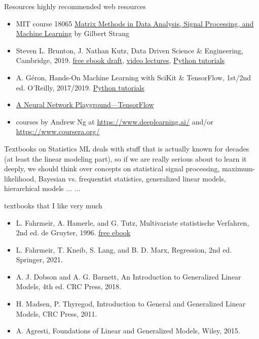 \documentclass[mathserif, aspectratio=1610]{intbeamer}
\begin{document}
\begin{frame}{Resources}
  highly recommended web resources
  \begin{itemize}
    \item MIT course 18065 \href{https://ocw.mit.edu/courses/18-065-matrix-methods-in-data-analysis-signal-processing-and-machine-learning-spring-2018/}{Matrix Methods in Data Analysis, Signal Processing, and Machine Learning} by Gilbert Strang
    \item Steven L. Brunton, J. Nathan Kutz, Data Driven Science \& Engineering, Cambridge, 2019.
    \href{http://www.databookuw.com/databook.pdf}{free ebook draft},
    \href{http://www.databookuw.com/}{video lectures},
    \href{https://github.com/dylewsky/Data_Driven_Science_Python_Demos}{Python tutorials}
    \item A. G\'{e}ron, Hands-On Machine Learning with SciKit \& TensorFlow, 1st/2nd ed. O'Reilly, 2017/2019.
    \href{https://github.com/ageron/handson-ml2}{Python tutorials}
    \item \href{https://playground.tensorflow.org}{A Neural Network Playground---TensorFlow}
    \item courses by Andrew Ng at \url{https://www.deeplearning.ai/} and/or \url{https://www.coursera.org/}
  \end{itemize}
\end{frame}

\begin{frame}{Textbooks on Statistics}
    ML deals with stuff that is actually known for decades (at least the linear modeling part), so if we are really
    serious about to learn it deeply, we should think over concepts on
    statistical signal processing, maximum-likelihood, Bayesian vs. frequentist
    statistics, generalized linear models, hierarchical models ... ...

    textbooks that I like very much
  \begin{itemize}
  \item L. Fahrmeir, A. Hamerle, and G. Tutz, Multivariate statistische Verfahren, 2nd ed. de Gruyter, 1996.
  \href{https://www.degruyter.com/document/doi/10.1515/9783110816020/html}{free ebook}
  \item L. Fahrmeir, T. Kneib, S. Lang, and B. D. Marx, Regression, 2nd ed. Springer, 2021.
  \item A. J. Dobson and A. G. Barnett, An Introduction to Generalized Linear Models, 4th ed. CRC Press, 2018.
  \item H. Madsen, P. Thyregod, Introduction to General and Generalized Linear Models, CRC Press, 2011.
  \item A. Agresti, Foundations of Linear and Generalized Models, Wiley, 2015.
  \end{itemize}
\end{frame}
\end{document}
